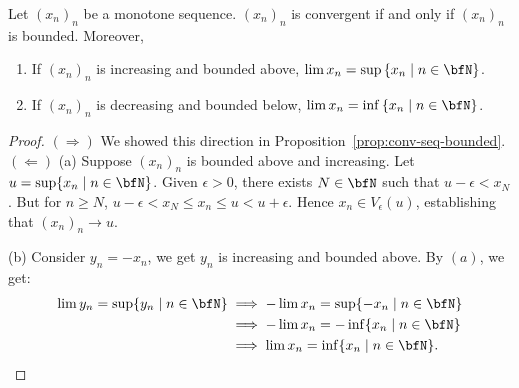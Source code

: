     \begin{theorem}\label{thm:monotome-conv-thm}
        Let $(x_n)_n$ be a monotone sequence. $(x_n)_n$ is convergent if and only if $(x_n)_n$ is bounded. Moreover,
            \begin{enumerate}[label = (\alph*)]
                \item If $(x_n)_n$ is increasing and bounded above, $\lim x_n = \sup \left\{x_n \mid n \in \bfN\right\}$.
                \item If $(x_n)_n$ is decreasing and bounded below, $\lim x_n = \inf \left\{x_n \mid n \in \bfN\right\}$.
            \end{enumerate}
    \end{theorem}
        \begin{proof}
            $(\Rightarrow)$ We showed this direction in Proposition~\ref{prop:conv-seq-bounded}. $(\Leftarrow)$ (a) Suppose $(x_n)_n$ is bounded above and increasing. Let $u = \sup\{x_n \mid n \in \bfN\}$. Given $\epsilon > 0$, there exists $N \in \bfN$ such that $u - \epsilon < x_N$. But for $n \geq N$, $u - \epsilon < x_N \leq x_n \leq u < u + \epsilon$. Hence $x_n \in V_\epsilon(u)$, establishing that $(x_n)_n \rightarrow u$.

            (b) Consider $y_n = -x_n$, we get $y_n$ is increasing and bounded above. By $(a)$, we get:
                \begin{equation*}
                \begin{split}
                    \lim y_n = \sup\{y_n \mid n \in \bfN\}
                    & \implies -\lim x_n = \sup\{-x_n \mid n \in \bfN\} \\
                    & \implies -\lim x_n = -\inf\{x_n \mid n \in \bfN\} \\
                    & \implies \lim x_n = \inf\{x_n \mid n \in \bfN\}. \qedhere
                \end{split}
                \end{equation*}
        \end{proof}
    
